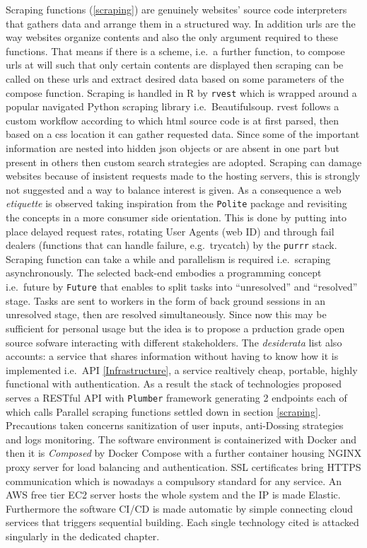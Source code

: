 \documentclass[
  12pt,
  a4paper,
  oneside]{book}
\newcommand{\passthrough}[1]{#1}
\theoremstyle{definition}
\theoremstyle{definition}
\theoremstyle{definition}
\theoremstyle{remark}
\begin{document}
Scraping functions (\ref{scraping}) are genuinely websites' source code interpreters that gathers data and arrange them in a structured way. In addition urls are the way websites organize contents and also the only argument required to these functions. That means if there is a scheme, i.e.~a further function, to compose urls at will such that only certain contents are displayed then scraping can be called on these urls and extract desired data based on some parameters of the compose function. Scraping is handled in R by \passthrough{\lstinline!rvest!} which is wrapped around a popular navigated Python scraping library i.e.~Beautifulsoup. rvest follows a custom workflow according to which html source code is at first parsed, then based on a css location it can gather requested data. Since some of the important information are nested into hidden json objects or are absent in one part but present in others then custom search strategies are adopted. Scraping can damage websites because of insistent requests made to the hosting servers, this is strongly not suggested and a way to balance interest is given. As a consequence a web \emph{etiquette} is observed taking inspiration from the \passthrough{\lstinline!Polite!} package and revisiting the concepts in a more consumer side orientation. This is done by putting into place delayed request rates, rotating User Agents (web ID) and through fail dealers (functions that can handle failure, e.g.~trycatch) by the \passthrough{\lstinline!purrr!} stack. Scraping function can take a while and parallelism is required i.e.~scraping asynchronously. The selected back-end embodies a programming concept i.e.~future by \passthrough{\lstinline!Future!} that enables to split tasks into ``unresolved'' and ``resolved'' stage. Tasks are sent to workers in the form of back ground sessions in an unresolved stage, then are resolved simultaneously. Since now this may be sufficient for personal usage but the idea is to propose a prduction grade open source sofware interacting with different stakeholders. The \emph{desiderata} list also accounts: a service that shares information without having to know how it is implemented i.e.~API \ref{Infrastructure}, a service realtively cheap, portable, highly functional with authentication. As a result the stack of technologies proposed serves a RESTful API with \passthrough{\lstinline!Plumber!} framework generating 2 endpoints each of which calls Parallel scraping functions settled down in section \ref{scraping}. Precautions taken concerns sanitization of user inputs, anti-Dossing strategies and logs monitoring. The software environment is containerized with Docker and then it is \emph{Composed} by Docker Compose with a further container housing NGINX proxy server for load balancing and authentication. SSL certificates bring HTTPS communication which is nowadays a compulsory standard for any service. An AWS free tier EC2 server hosts the whole system and the IP is made Elastic. Furthermore the software CI/CD is made automatic by simple connecting cloud services that triggers sequential building. Each single technology cited is attacked singularly in the dedicated chapter.
\end{document}
